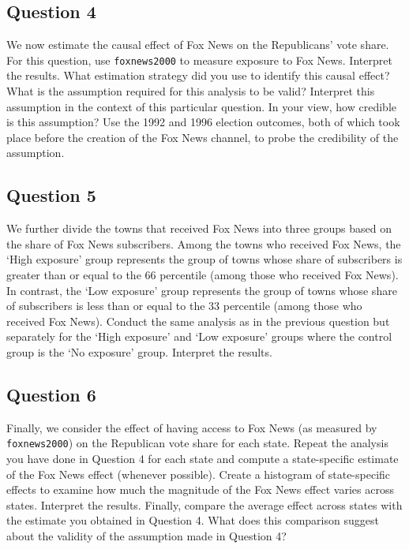 \documentclass[]{article}
\begin{document}
\subsection{Question 4}\label{question-4}

We now estimate the causal effect of Fox News on the Republicans' vote
share. For this question, use \texttt{foxnews2000} to measure exposure
to Fox News. Interpret the results. What estimation strategy did you use
to identify this causal effect? What is the assumption required for this
analysis to be valid? Interpret this assumption in the context of this
particular question. In your view, how credible is this assumption? Use
the 1992 and 1996 election outcomes, both of which took place before the
creation of the Fox News channel, to probe the credibility of the
assumption.

\subsection{Question 5}\label{question-5}

We further divide the towns that received Fox News into three groups
based on the share of Fox News subscribers. Among the towns who received
Fox News, the `High exposure' group represents the group of towns whose
share of subscribers is greater than or equal to the 66 percentile
(among those who received Fox News). In contrast, the `Low exposure'
group represents the group of towns whose share of subscribers is less
than or equal to the 33 percentile (among those who received Fox News).
Conduct the same analysis as in the previous question but separately for
the `High exposure' and `Low exposure' groups where the control group is
the `No exposure' group. Interpret the results.

\subsection{Question 6}\label{question-6}

Finally, we consider the effect of having access to Fox News (as
measured by \texttt{foxnews2000}) on the Republican vote share for each
state. Repeat the analysis you have done in Question 4 for each state
and compute a state-specific estimate of the Fox News effect (whenever
possible). Create a histogram of state-specific effects to examine how
much the magnitude of the Fox News effect varies across states.
Interpret the results. Finally, compare the average effect across states
with the estimate you obtained in Question 4. What does this comparison
suggest about the validity of the assumption made in Question 4?
\end{document}
